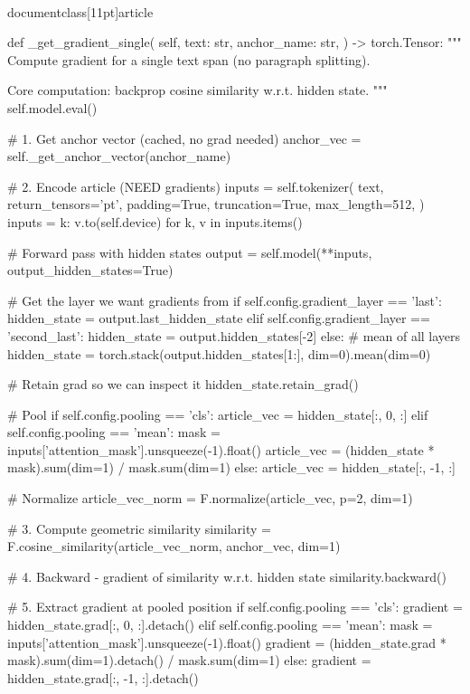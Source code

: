 \\documentclass[11pt]{article}
\begin{document}
\begin{CodeBlock}
    def _get_gradient_single(
        self,
        text: str,
        anchor_name: str,
    ) -> torch.Tensor:
        """
        Compute gradient for a single text span (no paragraph splitting).

        Core computation: backprop cosine similarity w.r.t. hidden state.
        """
        self.model.eval()

        # 1. Get anchor vector (cached, no grad needed)
        anchor_vec = self._get_anchor_vector(anchor_name)

        # 2. Encode article (NEED gradients)
        inputs = self.tokenizer(
            text,
            return_tensors='pt',
            padding=True,
            truncation=True,
            max_length=512,
        )
        inputs = {k: v.to(self.device) for k, v in inputs.items()}

        # Forward pass with hidden states
        output = self.model(**inputs, output_hidden_states=True)

        # Get the layer we want gradients from
        if self.config.gradient_layer == 'last':
            hidden_state = output.last_hidden_state
        elif self.config.gradient_layer == 'second_last':
            hidden_state = output.hidden_states[-2]
        else:  # mean of all layers
            hidden_state = torch.stack(output.hidden_states[1:], dim=0).mean(dim=0)

        # Retain grad so we can inspect it
        hidden_state.retain_grad()

        # Pool
        if self.config.pooling == 'cls':
            article_vec = hidden_state[:, 0, :]
        elif self.config.pooling == 'mean':
            mask = inputs['attention_mask'].unsqueeze(-1).float()
            article_vec = (hidden_state * mask).sum(dim=1) / mask.sum(dim=1)
        else:
            article_vec = hidden_state[:, -1, :]

        # Normalize
        article_vec_norm = F.normalize(article_vec, p=2, dim=1)

        # 3. Compute geometric similarity
        similarity = F.cosine_similarity(article_vec_norm, anchor_vec, dim=1)

        # 4. Backward - gradient of similarity w.r.t. hidden state
        similarity.backward()

        # 5. Extract gradient at pooled position
        if self.config.pooling == 'cls':
            gradient = hidden_state.grad[:, 0, :].detach()
        elif self.config.pooling == 'mean':
            mask = inputs['attention_mask'].unsqueeze(-1).float()
            gradient = (hidden_state.grad * mask).sum(dim=1).detach() / mask.sum(dim=1)
        else:
            gradient = hidden_state.grad[:, -1, :].detach()


\end{CodeBlock}
\end{document}
